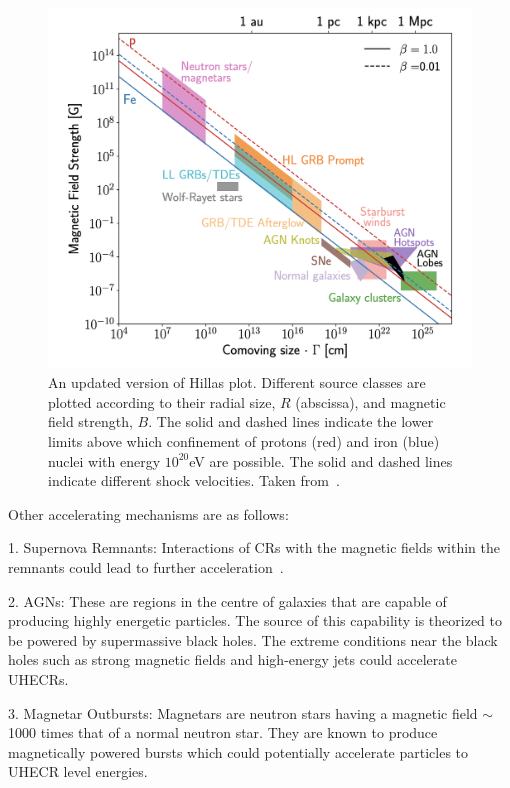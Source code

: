 \begin{figure}[t!]
  \centering
  \includegraphics[width=14.5cm]{thesis_figures/CRnNu/Hillas_modified.png}
  \caption{An updated version of Hillas plot. Different source classes are plotted according to their radial size, $R$ (abscissa), and magnetic field strength, $B$. The solid and dashed lines indicate the lower limits above which confinement of protons (red) and iron (blue) nuclei with energy $10^{20}$eV are possible. The solid and dashed lines indicate different shock velocities. Taken from~\cite{AlvesBatista:2019tlv}.}
  \label{fig:Hillas_modified}
\end{figure}


Other accelerating mechanisms are as follows:

1. Supernova Remnants:  Interactions of \glspl{CR} with the magnetic fields within the remnants could lead to further acceleration~\cite{BLASI_2011}.

2. \glspl{AGN}: These are regions in the centre of galaxies that are capable of producing highly energetic particles. The source of this capability is theorized to be powered by supermassive black holes. The extreme conditions near the black holes such as strong magnetic fields and high-energy jets could accelerate \glspl{UHECR}.~\cite{Rieger_2022}

3. Magnetar Outbursts: Magnetars are neutron stars having a magnetic field $\sim$1000 times that of a normal neutron star. They are known to produce magnetically powered bursts which could potentially accelerate particles to \gls{UHECR} level energies.~\cite{PhysRevD.84.023002}

